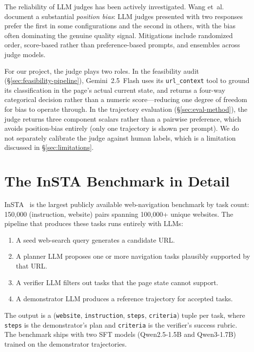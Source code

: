\documentclass[12pt,a4paper]{report}
\begin{document}
The reliability of LLM judges has been actively investigated. Wang et~al.~\cite{wang2023largejudge} document a substantial \emph{position bias}: LLM judges presented with two responses prefer the first in some configurations and the second in others, with the bias often dominating the genuine quality signal. Mitigations include randomized order, score-based rather than preference-based prompts, and ensembles across judge models.

For our project, the judge plays two roles. In the feasibility audit (\S\ref{sec:feasibility-pipeline}), Gemini~2.5~Flash uses its \texttt{url\_context} tool to ground its classification in the page's actual current state, and returns a four-way categorical decision rather than a numeric score---reducing one degree of freedom for bias to operate through. In the trajectory evaluation (\S\ref{sec:eval-method}), the judge returns three component scalars rather than a pairwise preference, which avoids position-bias entirely (only one trajectory is shown per prompt). We do not separately calibrate the judge against human labels, which is a limitation discussed in \S\ref{sec:limitations}.

\section{The InSTA Benchmark in Detail}\label{sec:lit-insta}

InSTA~\cite{trabucco2025insta} is the largest publicly available web-navigation benchmark by task count: 150{,}000 (instruction, website) pairs spanning 100{,}000+ unique websites. The pipeline that produces these tasks runs entirely with LLMs:
\begin{enumerate}
  \item A seed web-search query generates a candidate URL.
  \item A planner LLM proposes one or more navigation tasks plausibly supported by that URL.
  \item A verifier LLM filters out tasks that the page state cannot support.
  \item A demonstrator LLM produces a reference trajectory for accepted tasks.
\end{enumerate}

The output is a (\texttt{website}, \texttt{instruction}, \texttt{steps}, \texttt{criteria}) tuple per task, where \texttt{steps} is the demonstrator's plan and \texttt{criteria} is the verifier's success rubric. The benchmark ships with two SFT models (Qwen2.5-1.5B and Qwen3-1.7B) trained on the demonstrator trajectories.
\end{document}
